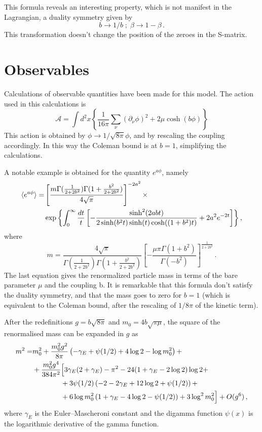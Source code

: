 \documentclass[12pt,a4paper]{report}
\begin{document}
This formula reveals an interesting property, which is not manifest in the Lagrangian, a duality symmetry given by \begin{equation}
b \to 1/b \; ; \; \beta \to 1- \beta \,.
\end{equation} This transformation doesn't change the position of the zeroes in the S-matrix.


\section{Observables}
Calculations of observable quantities have been made for this model. 
The action used in this calculations is \begin{equation}
\mathcal{A} = \int d^2x  \left\lbrace\dfrac{1}{16 \pi} \sum_\nu (\partial_\nu \phi )^2 + 2 \mu \cosh(b \phi) \right\rbrace 
\end{equation} This action is obtained by $\phi \to 1/ \sqrt{8 \pi} \phi$,
   and by rescaling the coupling accordingly. In this way the Coleman bound is at $b=1$, simplifying the calculations. 
   
   A notable example is obtained for the quantity $e^{a\phi}$, namely
\begin{align}
\braket{e^{a \phi}} =  &\left[ \dfrac{m\Gamma(\frac{1}{2+2b^2}) \Gamma(1+ \frac{b^2}{2+2b^2}) }{4 \sqrt{\pi}}  \right]^{-2 a^2} \times  \\ & \exp{\left\lbrace \int_0^\infty \dfrac{dt}{t} \left[ - \dfrac{\sinh^2(2 a b t)}{2 \sinh(b^2t) \sinh(t)\cosh((1+b^2)t) } + 2 a^2 e^{-2t} \right]  \right\rbrace } \nonumber \,,
\end{align} where \begin{equation}
\label{eq:mass_continuum}
m = \dfrac{4 \sqrt{\pi}}{\Gamma(\frac{1}{2+2b^2})\Gamma(1 +\frac{b^2}{2+2b^2}) } \left[ - \dfrac{\mu \pi \Gamma(1+b^2)}{\Gamma(-b^2)} \right]^{\frac{1}{2+2b^2}} \,.
\end{equation} The last equation gives the renormalized particle mass in terms of the bare parameter $\mu$ and the coupling b. It is remarkable that this formula don't satisfy the duality symmetry, and that the mass goes to zero for $b=1$ (which is equivalent to the Coleman bound, after the rescaling of $1/8\pi$ of the kinetic term).

After the redefinitions $g=b\sqrt{8\pi}$ and $m_0=4b\sqrt{\pi\mu}$, the square of the renormalised mass can be expanded in $g$ as
\begin{align}
m^2=&m_0^2+\frac{m_0^2g^2}{8\pi}\left(
-\gamma_E+\psi(1/2) +4 \log 2-\log m_0^2
\right)+\notag\\
&+\frac{m_0^2g^4}{384\pi^2}\Big[
3\gamma_E(2+\gamma_E)-\pi^2-24(1+\gamma_E-2\log 2)\log 2+\notag\\
&\qquad\qquad+3\psi(1/2)\left(-2-2\gamma_E+12\log 2+\psi(1/2)\right)+\notag\\
&\qquad\qquad+6\log m_0^2\left(1+\gamma_E-4\log 2-\psi(1/2)\right)+3\log^2m_0^2
\Big]+O(g^6)\,,
\end{align}
where $\gamma_E$ is the Euler–Mascheroni constant and the digamma function $\psi(x)$ is the logarithmic derivative of the gamma function.
\end{document}
